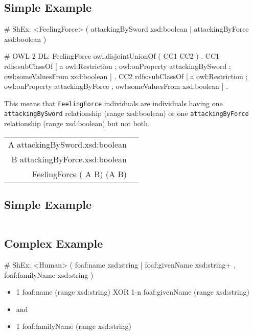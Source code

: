 \documentclass{llncs}
\newcommand{\ms}[1]{\texttt{#1}}
\newenvironment{DL}{
\vspace{0cm}
	\begin{center}
  \begin{tabular}{r l}

}{
  \end{tabular}
	\end{center}
}
\begin{document}
\subsection{Simple Example}

\begin{ex}
# ShEx:
<FeelingForce> { (  
    attackingBySword xsd:boolean | 
    attackingByForce xsd:boolean ) }
\end{ex}

\begin{ex}
# OWL 2 DL:
FeelingForce owl:disjointUnionOf ( CC1 CC2 ) . 
CC1 rdfs:subClassOf [
    a owl:Restriction ;
    owl:onProperty attackingBySword ;
    owl:someValuesFrom xsd:boolean ] .
CC2 rdfs:subClassOf [
    a owl:Restriction ;
    owl:onProperty attackingByForce ;
    owl:someValuesFrom xsd:boolean ] .
\end{ex}

This means that \ms{FeelingForce} individuals are individuals having one \\
\ms{attackingBySword} relationship (range xsd:boolean) or one \ms{attackingByForce} relationship (range xsd:boolean) but not both.

\begin{DL}
A   attackingBySword.xsd:boolean \\
B   attackingByForce.xsd:boolean \\ 
FeelingForce  ( A  B)  (A   B) \\
\end{DL}

\subsection{Simple Example}

\begin{DL}
 
\end{DL}

\subsection{Complex Example}

\begin{ex}
# ShEx:
<Human> { (  
    foaf:name xsd:string | foaf:givenName xsd:string+ , 
    foaf:familyName xsd:string ) }
\end{ex}

\begin{itemize}
	\item 1 foaf:name (range xsd:string) XOR 1-n foaf:givenName (range xsd:string)
	\item and
	\item 1 foaf:familyName (range xsd:string)
\end{itemize}
\end{document}

